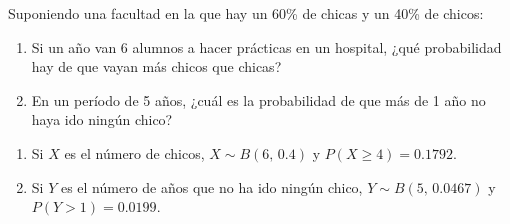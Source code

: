 {Suponiendo una facultad en la que hay un 60\% de chicas y un 40\% de chicos:
\begin{enumerate}
\item  Si un año van 6 alumnos a hacer prácticas en un hospital, ¿qué probabilidad hay de que vayan más chicos que chicas?
\item En un período de 5 años, ¿cuál es la probabilidad de que más de 1 año no haya ido ningún chico?
\end{enumerate}
}
{\begin{enumerate}
\item Si $X$ es el número de chicos, $X\sim B(6,\,0.4)$  y $P(X\geq 4)=0.1792$.
\item Si $Y$ es el número de años que no ha ido ningún chico, $Y \sim B(5,\,0.0467)$ y $P(Y>1)=0.0199$.
\end{enumerate}
}
